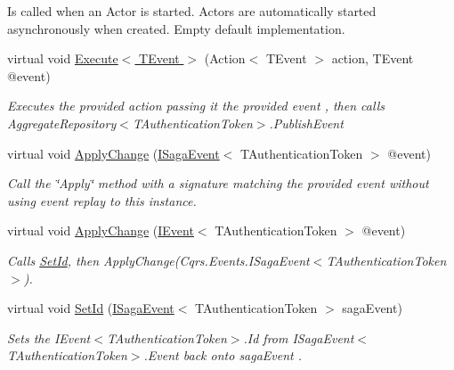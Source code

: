 \begin{DoxyCompactItemize}
\begin{DoxyCompactList}
Is called when an Actor is started. Actors are automatically started asynchronously when created. Empty default implementation. \end{DoxyCompactList}\item 
virtual void \hyperlink{classCqrs_1_1Akka_1_1Domain_1_1AkkaSaga_ac0782ac0b7e28418a52cead1b7b8b0c3_ac0782ac0b7e28418a52cead1b7b8b0c3}{Execute$<$ T\+Event $>$} (Action$<$ T\+Event $>$ action, T\+Event @event)
\begin{DoxyCompactList}\small\item\em Executes the provided {\itshape action}  passing it the provided {\itshape event} , then calls Aggregate\+Repository$<$\+T\+Authentication\+Token$>$.\+Publish\+Event \end{DoxyCompactList}\item 
virtual void \hyperlink{classCqrs_1_1Akka_1_1Domain_1_1AkkaSaga_a42126a6a1a7896d16412b6023f208f7c_a42126a6a1a7896d16412b6023f208f7c}{Apply\+Change} (\hyperlink{interfaceCqrs_1_1Events_1_1ISagaEvent}{I\+Saga\+Event}$<$ T\+Authentication\+Token $>$ @event)
\begin{DoxyCompactList}\small\item\em Call the \char`\"{}\+Apply\char`\"{} method with a signature matching the provided {\itshape event}  without using event replay to this instance. \end{DoxyCompactList}\item 
virtual void \hyperlink{classCqrs_1_1Akka_1_1Domain_1_1AkkaSaga_a18d554cd5ad329ab152efb7d852f2438_a18d554cd5ad329ab152efb7d852f2438}{Apply\+Change} (\hyperlink{interfaceCqrs_1_1Events_1_1IEvent}{I\+Event}$<$ T\+Authentication\+Token $>$ @event)
\begin{DoxyCompactList}\small\item\em Calls \hyperlink{classCqrs_1_1Akka_1_1Domain_1_1AkkaSaga_a3f3cf1a10203a1eead599e7529d41613_a3f3cf1a10203a1eead599e7529d41613}{Set\+Id}, then Apply\+Change(\+Cqrs.\+Events.\+I\+Saga\+Event$<$\+T\+Authentication\+Token$>$). \end{DoxyCompactList}\item 
virtual void \hyperlink{classCqrs_1_1Akka_1_1Domain_1_1AkkaSaga_a3f3cf1a10203a1eead599e7529d41613_a3f3cf1a10203a1eead599e7529d41613}{Set\+Id} (\hyperlink{interfaceCqrs_1_1Events_1_1ISagaEvent}{I\+Saga\+Event}$<$ T\+Authentication\+Token $>$ saga\+Event)
\begin{DoxyCompactList}\small\item\em Sets the I\+Event$<$\+T\+Authentication\+Token$>$.\+Id from I\+Saga\+Event$<$\+T\+Authentication\+Token$>$.\+Event back onto {\itshape saga\+Event} . \end{DoxyCompactList}\item 

\end{DoxyCompactItemize}
